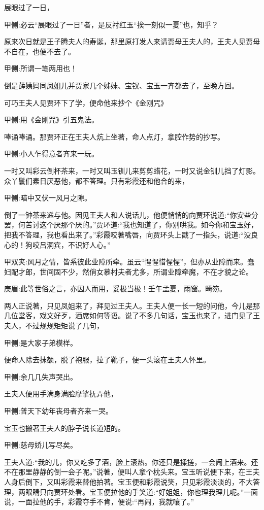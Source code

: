 \begin{parag}
    展眼过了一日，\begin{note}甲侧:必云“展眼过了一日”者，是反衬红玉“挨一刻似一夏”也，知乎？\end{note}原来次日就是王子腾夫人的寿诞，那里原打发人来请贾母王夫人的，王夫人见贾母不自在，也便不去了。\begin{note}甲侧:所谓一笔两用也！\end{note}倒是薛姨妈同凤姐儿并贾家几个姊妹、宝钗、宝玉一齐都去了，至晚方回。
\end{parag}


\begin{parag}
    可巧王夫人见贾环下了学，便命他来抄个《金刚咒》\begin{note}甲侧:用《金刚咒》引五鬼法。\end{note}唪诵唪诵。那贾环正在王夫人炕上坐著，命人点灯，拿腔作势的抄写。\begin{note}甲侧:小人乍得意者齐来一玩。\end{note}一时又叫彩云倒杯茶来，一时又叫玉钏儿来剪剪蜡花，一时又说金钏儿挡了灯影。众丫鬟们素日厌恶他，都不答理。只有彩霞还和他合的来，\begin{note}甲侧:暗中又伏一风月之隙。\end{note}倒了一钟茶来递与他。因见王夫人和人说话儿，他便悄悄的向贾环说道:“你安些分罢，何苦讨这个厌那个厌的。”贾环道:“我也知道了，你别哄我。如今你和宝玉好，把我不答理，我也看出来了。”彩霞咬著嘴唇，向贾环头上戳了一指头，说道:“没良心的！狗咬吕洞宾，不识好人心。”\begin{note}甲双夹:风月之情，皆系彼此业障所牵。虽云“惺惺惜惺惺”，但亦从业障而来。蠢妇配才郎，世间固不少，然俏女慕村夫者尤多，所谓业障牵魔，不在才貌之论。\end{note}\begin{note}庚眉:此等世俗之言，亦因人而用，妥极当极！壬午孟夏，雨窗。畸笏。\end{note}
\end{parag}


\begin{parag}
    两人正说著，只见凤姐来了，拜见过王夫人。王夫人便一长一短的问他，今儿是那几位堂客，戏文好歹，酒席如何等语。说了不多几句话，宝玉也来了，进门见了王夫人，不过规规矩矩说了几句，\begin{note}甲侧:是大家子弟模样。\end{note}便命人除去抹额，脱了袍服，拉了靴子，便一头滚在王夫人怀里。\begin{note}甲侧:余几几失声哭出。\end{note}王夫人便用手满身满脸摩挲抚弄他，\begin{note}甲侧:普天下幼年丧母者齐来一哭。\end{note}宝玉也搬著王夫人的脖子说长道短的。\begin{note}甲侧:慈母娇儿写尽矣。\end{note}王夫人道:“我的儿，你又吃多了酒，脸上滚热。你还只是揉搓，一会闹上酒来。还不在那里静静的倒一会子呢。”说著，便叫人拿个枕头来。宝玉听说便下来，在王夫人身后倒下，又叫彩霞来替他拍著。宝玉便和彩霞说笑，只见彩霞淡淡的，不大答理，两眼睛只向贾环处看。宝玉便拉他的手笑道:“好姐姐，你也理我理儿呢。”一面说，一面拉他的手，彩霞夺手不肯，便说:“再闹，我就嚷了。”
\end{parag}


